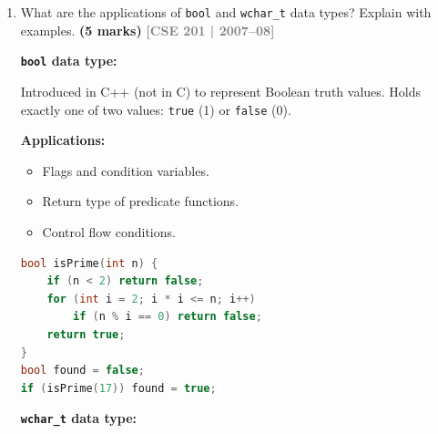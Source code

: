 \documentclass[12pt,a3paper]{article}
\newcommand{\yr}[1]{\hfill\textcolor{gray}{\small\textbf{[#1]}}}
\newcommand{\mk}[1]{\textcolor{orange!70!black}{\small\textbf{(#1 marks)}}}
\begin{document}
\begin{enumerate}
\begin{tcolorbox}[enhanced,breakable,ansbox,colback=cB!4,colframe=cB,
  boxrule=0.8pt,arc=5pt,
  title={\textbf{Answer}},fonttitle=\bfseries\color{white},colbacktitle=cB]
\medskip
\textbf{\texttt{mutable} keyword:}

A data member declared \texttt{mutable} can be modified even inside
a \texttt{const} member function.  It is used for members that
represent \emph{implementation state} (caches, locks, call counts)
rather than \emph{logical state}.

\begin{lstlisting}[language=C++]
class Database {
    mutable int queryCount;   // mutable: can change in const functions
    string data;
public:
    Database() : queryCount(0) {}
    string fetch(int id) const {
        queryCount++;          // allowed because queryCount is mutable
        return data;
    }
    int getQueryCount() const { return queryCount; }
};
\end{lstlisting}

\end{tcolorbox}

\item What are the applications of \texttt{bool} and \texttt{wchar\_t} data types? Explain with examples. \mk{5}
\yr{CSE 201 | 2007--08}

\begin{tcolorbox}[enhanced,breakable,ansbox,colback=cB!4,colframe=cB,
  boxrule=0.8pt,arc=5pt,
  title={\textbf{Answer}},fonttitle=\bfseries\color{white},colbacktitle=cB]

\textbf{\texttt{bool} data type:}

Introduced in C++ (not in C) to represent Boolean truth values.
Holds exactly one of two values: \texttt{true} (1) or
\texttt{false} (0).

\textbf{Applications:}
\begin{itemize}[itemsep=2pt]
  \item Flags and condition variables.
  \item Return type of predicate functions.
  \item Control flow conditions.
\end{itemize}

\begin{lstlisting}[language=C++]
bool isPrime(int n) {
    if (n < 2) return false;
    for (int i = 2; i * i <= n; i++)
        if (n % i == 0) return false;
    return true;
}
bool found = false;
if (isPrime(17)) found = true;
\end{lstlisting}

\medskip
\textbf{\texttt{wchar\_t} data type:}


\end{tcolorbox}
\end{enumerate}
\end{document}
